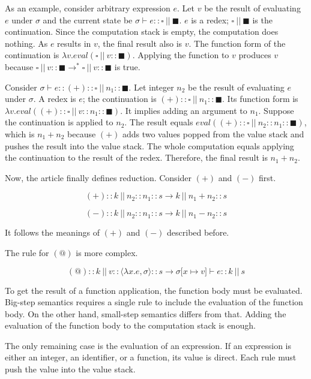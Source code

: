 As an example, consider arbitrary expression $e$. Let $v$ be the result of
evaluating $e$ under $\sigma$ and the current state be $\sigma\vdash e::\square\
||\ \blacksquare$. $e$ is a redex; $\square\ ||\ \blacksquare$ is the
continuation. Since the computation stack is empty, the computation does nothing.
As $e$ results in $v$, the final result also is $v$. The function form of the
continuation is $\lambda v.\mathit{eval}(\square\ ||\ v::\blacksquare)$. Applying
the function to $v$ produces $v$ because $\square\ ||\
v::\blacksquare\rightarrow^\ast \square\ ||\ v::\blacksquare$ is true.

Consider $\sigma\vdash e::(+)::\square\ ||\ n_1::\blacksquare$. Let integer $n_2$
be the result of evaluating $e$ under $\sigma$. A redex is $e$; the continuation
is $(+)::\square\ ||\ n_1::\blacksquare$. Its function form is $\lambda
v.\mathit{eval}((+)::\square\ ||\ v::n_1::\blacksquare)$. It implies adding an
argument to $n_1$. Suppose the continuation is applied to $n_2$. The result
equals $\mathit{eval}((+)::\square\ ||\ n_2::n_1::\blacksquare)$, which is
$n_1+n_2$ because $(+)$ adds two values popped from the value stack and pushes
the result into the value stack. The whole computation equals applying the
continuation to the result of the redex. Therefore, the final result is
$n_1+n_2$.

Now, the article finally defines reduction. Consider $(+)$ and $(-)$ first.

\[(+)::k\ ||\ n_2::n_1::s\rightarrow k\ ||\ n_1+n_2::s\]

\[(-)::k\ ||\ n_2::n_1::s\rightarrow k\ ||\ n_1-n_2::s\]

It follows the meanings of $(+)$ and $(-)$ described before.

The rule for $(@)$ is more complex.

\[(@)::k\ ||\ v::\langle\lambda x.e,\sigma\rangle::s\rightarrow \sigma\lbrack
x\mapsto             v\rbrack\vdash e::k\ ||\ s\]

To get the result of a function application, the function body must be evaluated.
Big-step semantics requires a single rule to include the evaluation of the
function body. On the other hand, small-step semantics differs from that. Adding
the evaluation of the function body to the computation stack is enough.

The only remaining case is the evaluation of an expression. If an expression is
either an integer, an identifier, or a function, its value is direct. Each rule
must push the value into the value stack.

